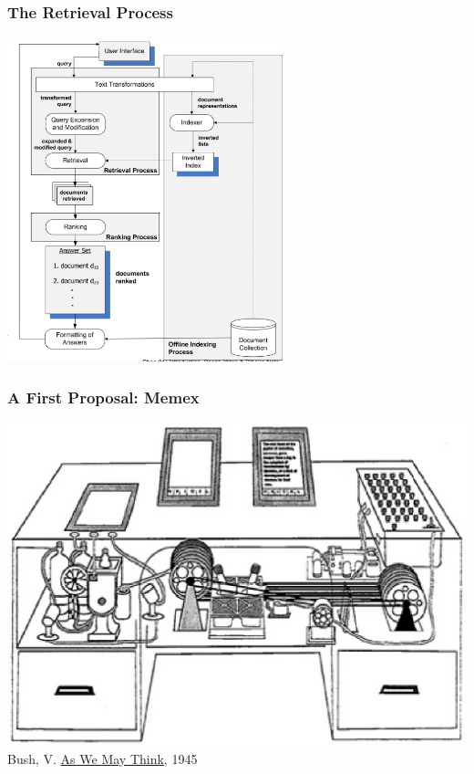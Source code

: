 \documentclass[svgnames]{beamer}
\begin{document}
\begin{frame}
    \frametitle{The Retrieval Process}

    \centering
    \includegraphics[width=0.6\textwidth]{process-mir2ed-2nd}
\end{frame}

\begin{frame}
    \frametitle{A First Proposal: Memex}
    
    \begin{center}
        \includegraphics[width=.8\linewidth]{memex}\\
        \raggedleft \footnotesize Bush, V. \href{https://www.theatlantic.com/magazine/archive/1945/07/as-we-may-think/303881/}{As We May Think}, 1945
    \end{center}

\end{frame}

\end{document}
